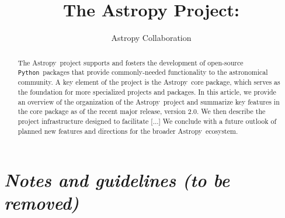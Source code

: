 \documentclass[modern]{aastex61}
\newcommand{\package}[1]{\texttt{#1}}
\newcommand{\python}{\package{Python}}
\newcommand{\astropy}{Astropy}
\begin{document}
\draft{\today}

\title{The Astropy Project: }


\author{Astropy Collaboration}

\begin{abstract}
The \astropy\ project supports and fosters the development of open-source
\python\ packages that provide commonly-needed functionality to the astronomical
community.
A key element of the project is the \astropy\ core package, which serves as the
foundation for more specialized projects and packages.
In this article, we provide an overview of the organization of the \astropy\
project and summarize key features in the core package as of the recent major
release, version 2.0.
We then describe the project infrastructure designed to facilitate [...]
We conclude with a future outlook of planned new features and directions for the
broader \astropy\ ecosystem.
\end{abstract}

\keywords{}

\section*{\textit{Notes and guidelines (to be removed)}}
\end{document}
